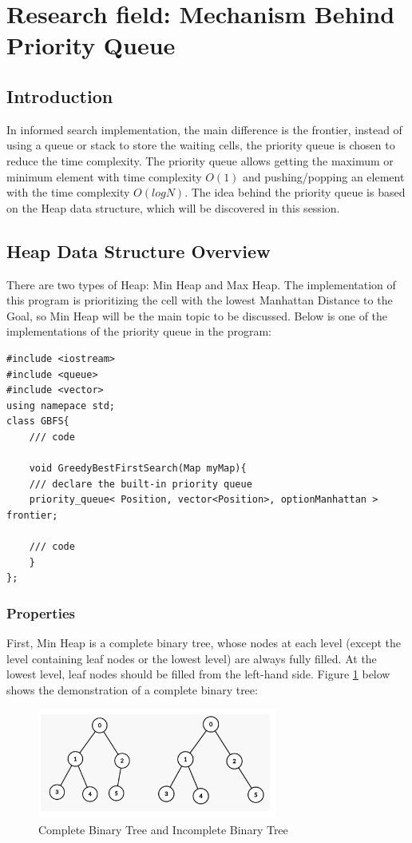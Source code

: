\documentclass{assignment}
\begin{document}
\newpage
\section{Research field: Mechanism Behind Priority Queue}
\subsection{Introduction}
In informed search implementation, the main difference is the frontier, instead of using a queue or stack to store the waiting cells, the priority queue is chosen to reduce the time complexity. The priority queue allows getting the maximum or minimum element with time complexity $O(1)$ and pushing/popping an element with the time complexity $O(logN)$. The idea behind the priority queue is based on the Heap data structure, which will be discovered in this session.
\subsection{Heap Data Structure Overview}
There are two types of Heap: Min Heap and Max Heap. The implementation of this program is prioritizing the cell with the lowest Manhattan Distance to the Goal, so Min Heap will be the main topic to be discussed. Below is one of the implementations of the priority queue in the program:

\begin{lstlisting}[caption={Using priority queue in program}]
#include <iostream>
#include <queue>
#include <vector>
using namepace std;
class GBFS{
	/// code
		
	void GreedyBestFirstSearch(Map myMap){
	/// declare the built-in priority queue
    priority_queue< Position, vector<Position>, optionManhattan > frontier;
    
    /// code
	}
};
\end{lstlisting}

\subsubsection{Properties}
First, Min Heap is a complete binary tree, whose nodes at each level (except the level containing leaf nodes or the lowest level) are always fully filled. At the lowest level, leaf nodes should be filled from the left-hand side. Figure \ref{fig:fig15} below shows the demonstration of a complete binary tree:

\begin{figure}[h]
    \centering
    \includegraphics[width=0.7\textwidth]{./assets/completeBinaryTree.png}
    \caption{Complete Binary Tree and Incomplete Binary Tree}
    \label{fig:fig15}
\end{figure}
\end{document}
